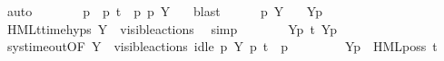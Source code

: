\begin{isabellebody}
\ auto\isanewline
\ \ \ \ \isamarkupfalse%
\ \isamarkupfalse%
\ p{\isacharprime}{\kern0pt}\ \ {\isacartoucheopen}p\ {\isasymlongmapsto}t\ \ p{\isacharprime}{\kern0pt}{\isacartoucheclose}\ {\isacartoucheopen}p{\isacharprime}{\kern0pt}\ {\isasymTTurnstile}{\isacharbrackleft}{\kern0pt}Y{\isacharbrackright}{\kern0pt}\ {\isasymphi}{\isacartoucheclose}\ \isamarkupfalse%
\ blast\isanewline
\ \ \ \ \isamarkupfalse%
\ {\isacartoucheopen}p{\isacharprime}{\kern0pt}\ {\isasymTTurnstile}{\isacharbrackleft}{\kern0pt}Y{\isacharbrackright}{\kern0pt}\ {\isasymphi}{\isacartoucheclose}\ \isamarkupfalse%
\ {\isacartoucheopen}{\isasymtheta}{\isacharbrackleft}{\kern0pt}Y{\isacharbrackright}{\kern0pt}{\isacharparenleft}{\kern0pt}p{\isacharprime}{\kern0pt}{\isacharparenright}{\kern0pt}\ {\isasymTurnstile}\ {\isasymsigma}{\isacharparenleft}{\kern0pt}{\isasymphi}{\isacharparenright}{\kern0pt}{\isacartoucheclose}\ \isamarkupfalse%
\ HMLt{\isacharunderscore}{\kern0pt}time{\isachardot}{\kern0pt}hyps\ {\isacartoucheopen}Y\ {\isasymsubseteq}\ visible{\isacharunderscore}{\kern0pt}actions{\isacartoucheclose}\ \isamarkupfalse%
\ simp\isanewline
\ \ \ \ \isamarkupfalse%
\ \isamarkupfalse%
\ {\isacartoucheopen}{\isasymtheta}{\isacharbrackleft}{\kern0pt}Y{\isacharbrackright}{\kern0pt}{\isacharparenleft}{\kern0pt}p{\isacharparenright}{\kern0pt}\ {\isasymlongmapsto}\isactrlsup {\isasymtheta}t\ {\isasymtheta}{\isacharbrackleft}{\kern0pt}Y{\isacharbrackright}{\kern0pt}{\isacharparenleft}{\kern0pt}p{\isacharprime}{\kern0pt}{\isacharparenright}{\kern0pt}{\isacartoucheclose}\ \isanewline
\ \ \ \ \ \ \isamarkupfalse%
\ sys{\isacharunderscore}{\kern0pt}timeout{\isacharbrackleft}{\kern0pt}OF\ {\isacartoucheopen}Y\ {\isasymsubseteq}\ visible{\isacharunderscore}{\kern0pt}actions{\isacartoucheclose}\ {\isacartoucheopen}idle\ p\ Y{\isacartoucheclose}\ {\isacartoucheopen}p\ {\isasymlongmapsto}t\ \ p{\isacharprime}{\kern0pt}{\isacartoucheclose}{\isacharbrackright}{\kern0pt}\ \isacommand{{\isachardot}{\kern0pt}}\isamarkupfalse%
\isanewline
\ \ \ \ \isamarkupfalse%
\ \isamarkupfalse%
\ {\isacartoucheopen}{\isasymtheta}{\isacharbrackleft}{\kern0pt}Y{\isacharbrackright}{\kern0pt}{\isacharparenleft}{\kern0pt}p{\isacharparenright}{\kern0pt}\ {\isasymTurnstile}\ HML{\isacharunderscore}{\kern0pt}poss\ t\ {\isasymsigma}{\isacharparenleft}{\kern0pt}{\isasymphi}{\isacharparenright}{\kern0pt}{\isacartoucheclose}\ \isamarkupfalse%

\end{isabellebody}
